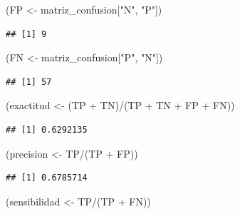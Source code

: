 \documentclass[
  12pt,
]{book}
\newenvironment{Shaded}{\begin{snugshade}}{\end{snugshade}}
\newcommand{\NormalTok}[1]{#1}
\newcommand{\OtherTok}[1]{\textcolor[rgb]{0.56,0.35,0.01}{#1}}
\newcommand{\SpecialCharTok}[1]{\textcolor[rgb]{0.00,0.00,0.00}{#1}}
\newcommand{\StringTok}[1]{\textcolor[rgb]{0.31,0.60,0.02}{#1}}
\theoremstyle{definition}
\theoremstyle{definition}
\theoremstyle{definition}
\theoremstyle{remark}
\begin{document}
\begin{Shaded}
\begin{Highlighting}[]
\NormalTok{(FP }\OtherTok{\textless{}{-}}\NormalTok{ matriz\_confusion[}\StringTok{"N"}\NormalTok{, }\StringTok{"P"}\NormalTok{])}
\end{Highlighting}
\end{Shaded}

\begin{verbatim}
## [1] 9
\end{verbatim}

\begin{Shaded}
\begin{Highlighting}[]
\NormalTok{(FN }\OtherTok{\textless{}{-}}\NormalTok{ matriz\_confusion[}\StringTok{"P"}\NormalTok{, }\StringTok{"N"}\NormalTok{])}
\end{Highlighting}
\end{Shaded}

\begin{verbatim}
## [1] 57
\end{verbatim}

\begin{Shaded}
\begin{Highlighting}[]
\NormalTok{(exactitud }\OtherTok{\textless{}{-}}\NormalTok{ (TP }\SpecialCharTok{+}\NormalTok{ TN)}\SpecialCharTok{/}\NormalTok{(TP }\SpecialCharTok{+}\NormalTok{ TN }\SpecialCharTok{+}\NormalTok{ FP }\SpecialCharTok{+}\NormalTok{ FN))}
\end{Highlighting}
\end{Shaded}

\begin{verbatim}
## [1] 0.6292135
\end{verbatim}

\begin{Shaded}
\begin{Highlighting}[]
\NormalTok{(precision }\OtherTok{\textless{}{-}}\NormalTok{ TP}\SpecialCharTok{/}\NormalTok{(TP }\SpecialCharTok{+}\NormalTok{ FP))}
\end{Highlighting}
\end{Shaded}

\begin{verbatim}
## [1] 0.6785714
\end{verbatim}

\begin{Shaded}
\begin{Highlighting}[]
\NormalTok{(sensibilidad }\OtherTok{\textless{}{-}}\NormalTok{ TP}\SpecialCharTok{/}\NormalTok{(TP }\SpecialCharTok{+}\NormalTok{ FN))}
\end{Highlighting}
\end{Shaded}
\end{document}
